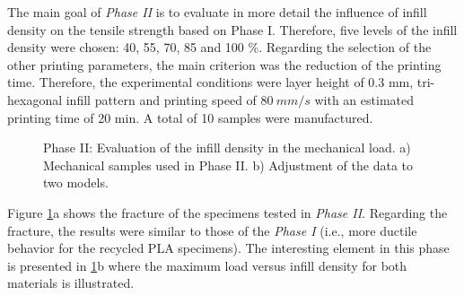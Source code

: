 \documentclass[
  12pt]{article}
\begin{document}
The main goal of \emph{Phase II} is to evaluate in more detail the influence of infill density on the tensile strength based on Phase I.
Therefore, five levels of the infill density were chosen: 40, 55, 70, 85 and 100 \%. Regarding the selection of the other printing parameters, the main criterion was the reduction of the printing time.
Therefore, the experimental conditions were layer height of 0.3 mm, tri-hexagonal infill pattern and printing speed of \(80~mm/s\) with an estimated printing time of 20 min.
A total of 10 samples were manufactured.

\begin{figure}[!h]

{\centering {}

}

\caption{Phase II: Evaluation of the infill density in the mechanical load. a) Mechanical samples used in Phase II. b) Adjustment of the data to two models.}\label{fig:phase2}
\end{figure}

Figure \ref{fig:phase2}a shows the fracture of the specimens tested in \emph{Phase II}. Regarding the fracture, the results were similar to those of the \emph{Phase I} (i.e., more ductile behavior for the recycled PLA specimens).
The interesting element in this phase is presented in \ref{fig:phase2}b where the maximum load versus infill density for both materials is illustrated.
\end{document}
